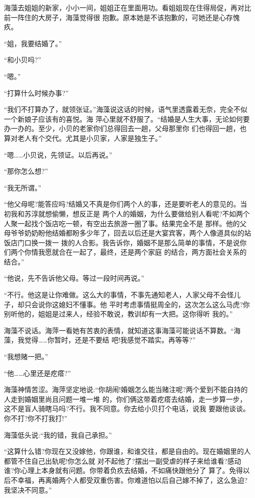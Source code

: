\documentclass[11pt,a4paper,onecolumn]{article}
\begin{document}
海藻去姐姐的新家，小小一间，姐姐正在里面用功。看姐姐现在住得局促，再对比前一阵住的大房子，海藻觉得很
抱歉。原本她是不该抱歉的，可她还是心存愧疚。

``姐，我要结婚了。''

``和小贝吗?''

``嗯。''

``打算什么时候办事?''

``我们不打算办了，就领张证。''海藻说这话的时候，语气里透露着无奈，完全不似一个新娘子应该有的喜悦。海
萍心里就不舒服了。``结婚是人生大事，无论如何要办一办的。至少，小贝的老家你们总得回去一趟，父母那里你
们也得回一趟，也算对老人有个交代。尤其是小贝家，人家是独生子。''

``嗯……小贝说，先领证。以后再说。''

``那你怎么想?''

``我无所谓。''

``他父母呢?能答应吗?结婚又不真是你们两个人的事，还是要听老人的意见的。当初我和苏淳就想偷懒，想反正是
两个人的婚姻，为什么要做给别人看呢?不如两个人聚一起找个饭店吃一顿，有空出去旅游一圈了事。结果完全不是
那样。他的父母爷爷奶奶盼他结婚都盼多少年了，回去以后还是大宴宾客，两个人像道具似的站饭店门口换一拨一
拨的人合影。我告诉你，婚姻不是那么简单的事情，不是说你们两个你情我愿就合在一起了，最终，还是两个家庭
的结合，两方面社会关系的结合。''

``他说，先不告诉他父母。等过一段时间再说。''

``不行。他这是让你难做。这么大的事情，不事先通知老人，人家父母不会怪儿子，却只会说你这媳妇不懂事。他
平时考虑事情挺周全的，这次怎么这么马虎?你别听他的，姐姐是过来人，经验不敢说，教训却有一大把。这你得听
我的。''

海藻不说话。海萍一看她有苦衷的表情，就知道这事海藻可能说话不算数。``海藻，我觉得……你暂时，还是不要结
吧!我感觉不踏实。再等等?''

``我想赌一把。''

``他……心里还是疙瘩?''

海藻神情苦涩。海萍坚定地说:``你胡闹!婚姻怎么能当赌注呢?两个爱到不能自持的人走到婚姻里尚且问题一堆一堆
的，你们俩这带着疙瘩去结婚，走一步算一步，这不是盲人骑瞎马吗?不行。我不同意。你去给小贝打个电话，说我
要跟他谈谈。你不打?你不打我打!''

海藻低头说:``我的错，我自己承担。''

``这算什么错?你现在又没嫁他，你跟谁，和谁交往，都是自由的。现在婚姻里的人都管不住自己出轨呢!你怎么就
对不起他了?摆出一副受虐的样子来给谁看?感动谁?你心理上本身就有问题。你带着负疚去结婚，不如痛快跟他分了
算了。免得以后不幸福，再离婚两个人都受双重伤害。你难道怕以后自己嫁不掉了，这么急迫?我坚决不同意。''
\end{document}
